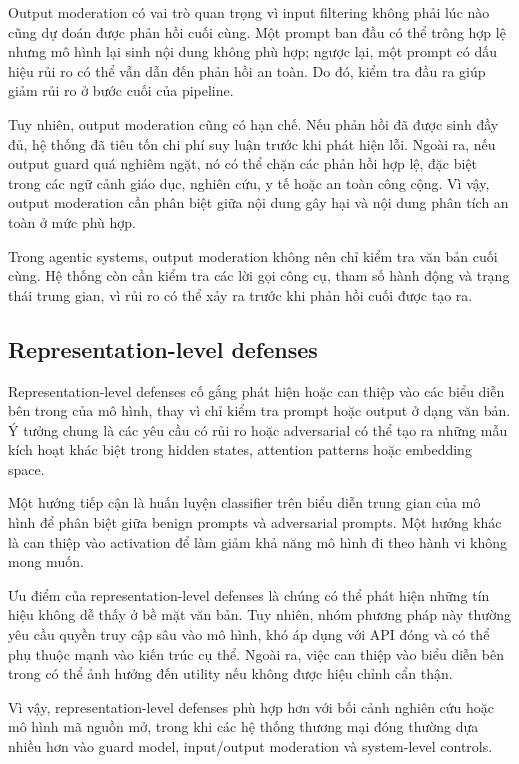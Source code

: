 Output moderation có vai trò quan trọng vì input filtering không phải lúc
nào cũng dự đoán được phản hồi cuối cùng. Một prompt ban đầu có thể trông
hợp lệ nhưng mô hình lại sinh nội dung không phù hợp; ngược lại, một prompt
có dấu hiệu rủi ro có thể vẫn dẫn đến phản hồi an toàn. Do đó, kiểm tra
đầu ra giúp giảm rủi ro ở bước cuối của pipeline.

Tuy nhiên, output moderation cũng có hạn chế. Nếu phản hồi đã được sinh
đầy đủ, hệ thống đã tiêu tốn chi phí suy luận trước khi phát hiện lỗi.
Ngoài ra, nếu output guard quá nghiêm ngặt, nó có thể chặn các phản hồi hợp
lệ, đặc biệt trong các ngữ cảnh giáo dục, nghiên cứu, y tế hoặc an toàn
công cộng. Vì vậy, output moderation cần phân biệt giữa nội dung gây hại
và nội dung phân tích an toàn ở mức phù hợp.

Trong agentic systems, output moderation không nên chỉ kiểm tra văn bản
cuối cùng. Hệ thống còn cần kiểm tra các lời gọi công cụ, tham số hành động
và trạng thái trung gian, vì rủi ro có thể xảy ra trước khi phản hồi cuối
được tạo ra.

\subsection{Representation-level defenses}
\label{subsec:representation-level-defenses}

Representation-level defenses cố gắng phát hiện hoặc can thiệp vào các
biểu diễn bên trong của mô hình, thay vì chỉ kiểm tra prompt hoặc output ở
dạng văn bản. Ý tưởng chung là các yêu cầu có rủi ro hoặc adversarial có
thể tạo ra những mẫu kích hoạt khác biệt trong hidden states, attention
patterns hoặc embedding space.

Một hướng tiếp cận là huấn luyện classifier trên biểu diễn trung gian của
mô hình để phân biệt giữa benign prompts và adversarial prompts. Một hướng
khác là can thiệp vào activation để làm giảm khả năng mô hình đi theo
hành vi không mong muốn.

Ưu điểm của representation-level defenses là chúng có thể phát hiện những
tín hiệu không dễ thấy ở bề mặt văn bản. Tuy nhiên, nhóm phương pháp này
thường yêu cầu quyền truy cập sâu vào mô hình, khó áp dụng với API đóng và
có thể phụ thuộc mạnh vào kiến trúc cụ thể. Ngoài ra, việc can thiệp vào
biểu diễn bên trong có thể ảnh hưởng đến utility nếu không được hiệu chỉnh
cẩn thận.

Vì vậy, representation-level defenses phù hợp hơn với bối cảnh nghiên cứu
hoặc mô hình mã nguồn mở, trong khi các hệ thống thương mại đóng thường
dựa nhiều hơn vào guard model, input/output moderation và system-level
controls.

